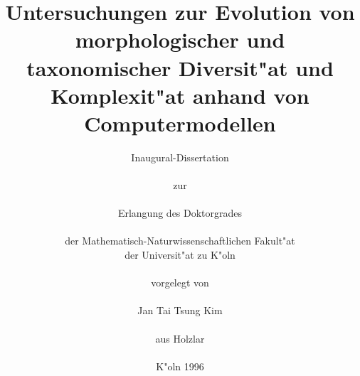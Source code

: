 \documentclass[12pt, a4paper, fleqn]{book}
\begin{document}
\title{\textbf{Untersuchungen zur Evolution von morphologischer und taxonomischer Diversit"at
und Komplexit"at anhand von Computermodellen}}

\author{Inaugural-Dissertation \\
\vspace*{0.2cm} \\
zur \\
\vspace*{0.2cm} \\
Erlangung des Doktorgrades \\
\vspace*{0.2cm} \\
der Mathematisch-Naturwissenschaftlichen Fakult"at \\
der Universit"at zu K"oln \\
\vspace*{2cm} \\
vorgelegt von \\
\vspace*{0.5cm} \\
{\Large Jan Tai Tsung Kim} \\
\vspace*{0.2cm} \\
aus Holzlar \\
\vspace*{1cm} \\
K"oln 1996}
\date{}
\maketitle
\end{document}

